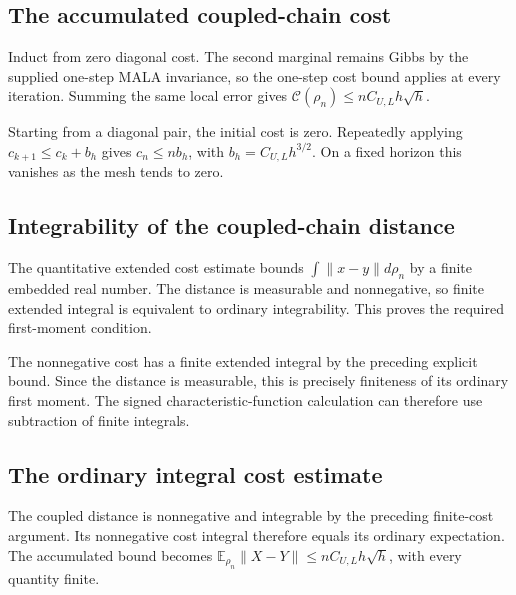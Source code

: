 \documentclass[11pt,a4paper]{report}
\begin{document}
\subsection{\texorpdfstring{The accumulated coupled-chain cost}{The accumulated coupled-chain cost}}
\label{report-step-UnadjustedLangevin-MALACoupling-lean-24}


Induct from zero diagonal cost. The second marginal remains Gibbs by the supplied one-step MALA invariance, so the one-step cost bound applies at every iteration. Summing the same local error gives \(\mathcal C(\rho_n)\le nC_{U,L}h\sqrt h\).



Starting from a diagonal pair, the initial cost is zero. Repeatedly applying \(c_{k+1}\le c_k+b_h\) gives \(c_n\le n b_h\), with \(b_h=C_{U,L}h^{3/2}\). On a fixed horizon this vanishes as the mesh tends to zero.

\subsection{\texorpdfstring{Integrability of the coupled-chain distance}{Integrability of the coupled-chain distance}}
\label{report-step-UnadjustedLangevin-MALACoupling-lean-25}


The quantitative extended cost estimate bounds \(\int\|x-y\|d\rho_n\) by a finite embedded real number. The distance is measurable and nonnegative, so finite extended integral is equivalent to ordinary integrability. This proves the required first-moment condition.



The nonnegative cost has a finite extended integral by the preceding explicit bound. Since the distance is measurable, this is precisely finiteness of its ordinary first moment. The signed characteristic-function calculation can therefore use subtraction of finite integrals.

\subsection{\texorpdfstring{The ordinary integral cost estimate}{The ordinary integral cost estimate}}
\label{report-step-UnadjustedLangevin-MALACoupling-lean-26}


The coupled distance is nonnegative and integrable by the preceding finite-cost argument. Its nonnegative cost integral therefore equals its ordinary expectation. The accumulated bound becomes \(\mathbb E_{\rho_n}\|X-Y\|\le nC_{U,L}h\sqrt h\), with every quantity finite.
\end{document}
